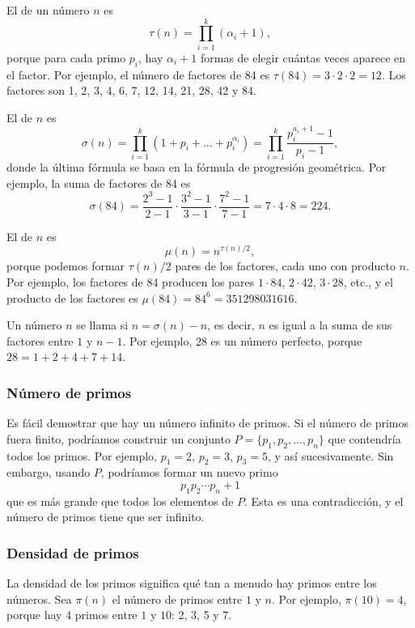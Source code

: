 El  de un número $n$ es
\[\tau(n)=\prod_{i=1}^k (\alpha_i+1),\]
porque para cada primo $p_i$, hay
$\alpha_i+1$ formas de elegir cuántas veces
aparece en el factor.
Por ejemplo, el número de factores
de 84 es
$\tau(84)=3 \cdot 2 \cdot 2 = 12$.
Los factores son
1, 2, 3, 4, 6, 7, 12, 14, 21, 28, 42 y 84.

El  de $n$ es
\[\sigma(n)=\prod_{i=1}^k (1+p_i+\ldots+p_i^{\alpha_i}) = \prod_{i=1}^k \frac{p_i^{a_i+1}-1}{p_i-1},\]
donde la última fórmula se basa en la fórmula de progresión geométrica.
Por ejemplo, la suma de factores de 84 es
\[\sigma(84)=\frac{2^3-1}{2-1} \cdot \frac{3^2-1}{3-1} \cdot \frac{7^2-1}{7-1} = 7 \cdot 4 \cdot 8 = 224.\]

El  de $n$ es
\[\mu(n)=n^{\tau(n)/2},\]
porque podemos formar $\tau(n)/2$ pares de los factores,
cada uno con producto $n$.
Por ejemplo, los factores de 84
producen los pares
$1 \cdot 84$, $2 \cdot 42$, $3 \cdot 28$, etc.,
y el producto de los factores es $\mu(84)=84^6=351298031616$.


Un número $n$ se llama  si $n=\sigma(n)-n$,
es decir, $n$ es igual a la suma de sus factores
entre $1$ y $n-1$.
Por ejemplo, 28 es un número perfecto,
porque $28=1+2+4+7+14$.

\subsubsection{Número de primos}

Es fácil demostrar que hay un número infinito
de primos.
Si el número de primos fuera finito,
podríamos construir un conjunto $P=\{p_1,p_2,\ldots,p_n\}$
que contendría todos los primos.
Por ejemplo, $p_1=2$, $p_2=3$, $p_3=5$, y así sucesivamente.
Sin embargo, usando $P$, podríamos formar un nuevo primo
\[p_1 p_2 \cdots p_n+1\]
que es más grande que todos los elementos de $P$.
Esta es una contradicción, y el número de primos
tiene que ser infinito.

\subsubsection{Densidad de primos}

La densidad de los primos significa qué tan a menudo hay primos
entre los números.
Sea $\pi(n)$ el número de primos entre
$1$ y $n$. Por ejemplo, $\pi(10)=4$, porque
hay 4 primos entre $1$ y $10$: 2, 3, 5 y 7.

